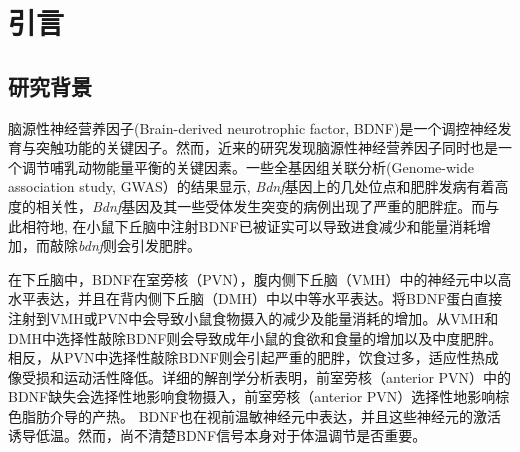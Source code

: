 \chapter{引言}\label{chap:introduction}


\section{研究背景}
脑源性神经营养因子(Brain-derived neurotrophic factor, BDNF)是一个调控神经发育与突触功能的关键因子。然而，近来的研究发现脑源性神经营养因子同时也是一个调节哺乳动物能量平衡的关键因素\citep{xu2016neurotrophic}。一些全基因组关联分析(Genome-wide association study, GWAS）的结果显示, \textit{Bdnf}基因上的几处位点和肥胖发病有着高度的相关性\citep{thorleifsson2009genome,speliotes2010association,wen2012meta}，\textit{Bdnf}基因及其一些受体发生突变的病例出现了严重的肥胖症\citep{gray2006hyperphagia}。而与此相符地, 在小鼠下丘脑中注射BDNF已被证实可以导致进食减少和能量消耗增加\citep{wang2007abrain,wang2007bbrain,wang2010brain,godar2011reduction}，而敲除\textit{bdnf}则会引发肥胖\citep{xu2003brain, unger2007selective, liao2012dendritically}。

在下丘脑中，BDNF在室旁核（PVN），腹内侧下丘脑（VMH）中的神经元中以高水平表达，并且在背内侧下丘脑（DMH）中以中等水平表达\citep{xu2003brain, unger2007selective, liao2012dendritically, an2015discrete}。将BDNF蛋白直接注射到VMH或PVN中会导致小鼠食物摄入的减少及能量消耗的增加\citep{wang2007abrain,wang2007bbrain,godar2011reduction}。从VMH和DMH中选择性敲除BDNF则会导致成年小鼠的食欲和食量的增加以及中度肥胖\citep{unger2007selective}。相反，从PVN中选择性敲除BDNF则会引起严重的肥胖，饮食过多，适应性热成像受损和运动活性降低\citep{an2015discrete}。详细的解剖学分析表明，前室旁核（anterior PVN）中的BDNF缺失会选择性地影响食物摄入，前室旁核（anterior PVN）选择性地影响棕色脂肪介导的产热\citep{an2015discrete}。 BDNF也在视前温敏神经元中表达\citep{tan2016warm,zhao2017hypothalamic}，并且这些神经元的激活诱导低温\citep{tan2016warm}。然而，尚不清楚BDNF信号本身对于体温调节是否重要。